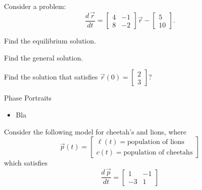\question
Consider a problem:
$$
\frac{d \,\vec{r}}{dt} = \begin{bmatrix} 4 & -1 \\ 8 & -2\end{bmatrix} \vec{r} - \begin{bmatrix} 5 \\ 10 \end{bmatrix}.
$$
\begin{parts}
	\item Find the equilibrium solution.
	\item Find the general solution.
	\item Find the solution that satisfies $\vec{r}(0) = \begin{bmatrix} 2 \\ 3\end{bmatrix}$?
\end{parts}






\standardonlynewpage

%
%



\begin{module}{Phase Portraits}
	\label{sys:phase}

	
	
\end{module}



\begin{lesson}

	\begin{itemize}
		\item Bla
	\end{itemize}
	

\end{lesson}





\question
	Consider the following model for cheetah's and lions, where
	$$ \vec{p}(t) = \begin{bmatrix} \ell(t) = \text{population of lions} \\ c(t) = \text{population of cheetahs} \end{bmatrix} $$
	which satisfies
	$$
	\frac{d\,\vec{p}}{dt} = \begin{bmatrix}
 		1 & -1 \\
 		-3 & 1
 	\end{bmatrix}
	$$
	
